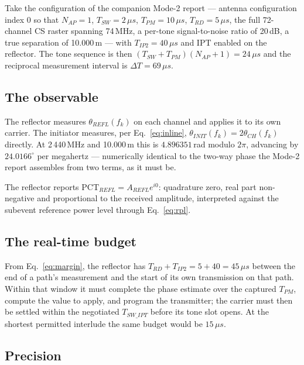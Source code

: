 \documentclass[11pt,a4paper]{article}
\newcommand{\us}{\,\ensuremath{\upmu}s}
\newcommand{\PCT}{\ensuremath{\mathrm{PCT}}}
\newcommand{\IPT}{\ensuremath{\mathrm{IPT}}}
\newcommand{\Tsw}{T_{SW}}
\newcommand{\Tswipt}{T_{SW\_IPT}}
\newcommand{\Tpm}{T_{PM}}
\newcommand{\Trd}{T_{RD}}
\newcommand{\Tiptwo}{T_{IP2}}
\newcommand{\Nap}{N_{AP}}
\providecommand{\upmu}{\mu}
\begin{document}
Take the configuration of the companion Mode-2 report --- antenna configuration index 0 so that
$\Nap = 1$, $\Tsw = 2\us$, $\Tpm = 10\us$, $\Trd = 5\us$, the full 72-channel CS raster spanning
74\,MHz, a per-tone signal-to-noise ratio of 20\,dB, a true separation of 10.000\,m --- with
$\Tiptwo = 40\us$ and \IPT{} enabled on the reflector. The tone sequence is then
$(\Tsw+\Tpm)(\Nap+1) = 24\us$ and the reciprocal measurement interval is $\Delta T = 69\us$.

\subsection{The observable}

The reflector measures $\theta_{REFL}(f_k)$ on each channel and applies it to its own carrier. The
initiator measures, per Eq.~\eqref{eq:inline}, $\theta_{INIT}(f_k) = 2\theta_{CH}(f_k)$ directly. At
2\,440\,MHz and 10.000\,m this is $4.896351$\,rad modulo $2\pi$, advancing by $24.0166^{\circ}$ per
megahertz --- numerically identical to the two-way phase the Mode-2 report assembles from two terms,
as it must be.

The reflector reports $\PCT_{REFL} = A_{REFL}e^{i0}$: quadrature zero, real part non-negative and
proportional to the received amplitude, interpreted against the subevent reference power level
through Eq.~\eqref{eq:rpl}.

\subsection{The real-time budget}

From Eq.~\eqref{eq:margin}, the reflector has $\Trd + \Tiptwo = 5 + 40 = 45\us$ between the end of a
path's measurement and the start of its own transmission on that path. Within that window it must
complete the phase estimate over the captured $\Tpm$, compute the value to apply, and program the
transmitter; the carrier must then be settled within the negotiated $\Tswipt$ before its tone slot
opens. At the shortest permitted interlude the same budget would be $15\us$.

\subsection{Precision}
\end{document}
